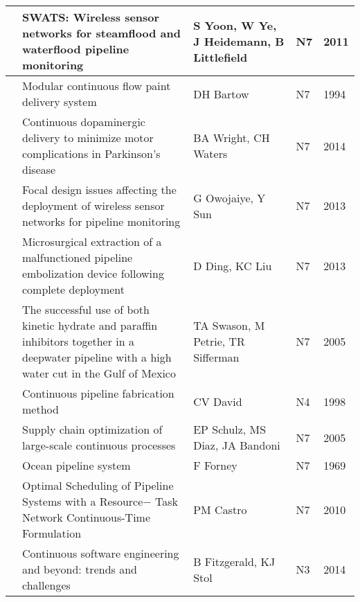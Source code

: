 \begin{landscape}
\begin{longtable}{|l|L{10cm}|L{10cm}|l|l|}
     & SWATS: Wireless sensor networks for steamflood and waterflood pipeline monitoring & S Yoon, W Ye, J Heidemann, B Littlefield & N7 & 2011 \\ \hline
    
     & Modular continuous flow paint delivery system
     & DH Bartow & N7 & 1994 \\ \hline
    
     & Continuous dopaminergic delivery to minimize motor complications in Parkinson's disease & BA Wright, CH Waters & N7 & 2014 \\ \hline
    
     & Focal design issues affecting the deployment of wireless sensor networks for pipeline monitoring
     & G Owojaiye, Y Sun & N7 & 2013 \\ \hline
    
     & Microsurgical extraction of a malfunctioned pipeline embolization device following complete deployment & D Ding, KC Liu & N7 & 2013 \\ \hline
    
     & The successful use of both kinetic hydrate and paraffin inhibitors together in a deepwater pipeline with a high water cut in the Gulf of Mexico
     & TA Swason, M Petrie, TR Sifferman & N7 & 2005 \\ \hline
    
     & Continuous pipeline fabrication method
     & CV David & N4 & 1998 \\ \hline
    
     & Supply chain optimization of large-scale continuous processes
     & EP Schulz, MS Diaz, JA Bandoni & N7 & 2005 \\ \hline
    
     & Ocean pipeline system
     & F Forney & N7 & 1969 \\ \hline
    
     & Optimal Scheduling of Pipeline Systems with a Resource− Task Network Continuous-Time Formulation
     & PM Castro & N7 & 2010 \\ \hline
    
     & Continuous software engineering and beyond: trends and challenges & B Fitzgerald, KJ Stol & N3 & 2014 \\ \hline
    

\end{longtable}
\end{landscape}
